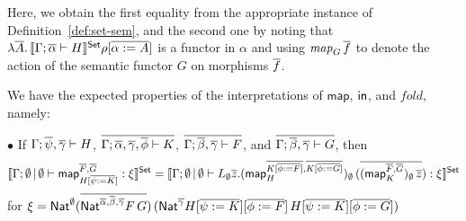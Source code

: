 \documentclass[runningheads]{llncs}
\renewcommand{\id}{\mathit{id}}
\newcommand{\map}{\mathsf{map}}
\newcommand{\fold}{\mathit{fold}}
\renewcommand{\id}{\mathit{id}}
\begin{document}
\begin{comment}
\[\begin{array}{rl}
&\setsem{
\Gamma;\emptyset \,|\, \emptyset
\vdash \map^{\ol{\sigma},\ol{\tau}}_H
: \Nat^\emptyset\;(\ol{\Nat^{\emptyset}\,\sigma\,\tau})\; {}
(\Nat^{\emptyset}\,H[\ol{\alpha := \sigma}]\,H[\ol{\alpha := \tau}])
} \rho\, \ast \\
=& \lambda \ol{f : \setsem{\Gamma; \emptyset \vdash \sigma}\rho \to \setsem{\Gamma; \emptyset \vdash \tau}\rho}.\,
\setsem{\Gamma; \ol{\alpha}\vdash H}
\id_{\rho}[\ol{\alpha := f}] \\
=& \lambda \ol{f : \setsem{\Gamma; \emptyset \vdash \sigma}\rho \to \setsem{\Gamma; \emptyset \vdash \tau}\rho}.\,
\mathit{map}_{\lambda \ol{A}.\,\setsem{\Gamma; \ol{\alpha}\vdash H} \rho [\ol{\alpha := A}]} \ol{f} \\
=& \mathit{map}_{\lambda \ol{A}.\,\setsem{\Gamma; \ol{\alpha}\vdash H} \rho [\ol{\alpha := A}]}
\end{array}
\]
\end{comment}

\vspace*{0.05in}

\noindent
Here, we obtain the first equality from the appropriate instance of
Definition~\ref{def:set-sem}, and the second one by noting that
$\lambda \overline{A}.\,\llbracket{\Gamma; \overline{\alpha}\vdash H}\rrbracket^{\mathsf{Set}} \rho
[\overline{\alpha := A}]$ is a functor in $\alpha$ and using
$\mathit{map}_G\,\overline{f}$ to denote the action of the semantic functor
$G$ on morphisms $\overline{f}$.

\vspace*{0.1in}

We have the expected properties of the interpretations of $\map$,
$\mathsf{in}$, and $\fold$, namely:

\vspace*{0.1in}

\noindent
$\bullet$\;  If
$\Gamma; \overline{\psi}, \overline{\gamma} \vdash H$,\;
$\overline{\Gamma; \overline{\alpha}, \overline{\gamma}, \overline{\phi} \vdash K}$,\;
$\overline{\Gamma; \overline{\beta}, \overline{\gamma} \vdash F}$,\; and
$\overline{\Gamma; \overline{\beta}, \overline{\gamma} \vdash G}$,
then
\[\setsem{\Gamma; \emptyset \,|\, \emptyset \vdash
\map_{H[\ol{\psi := K}]}^{\ol{F}, \ol{G}} : \xi} = \setsem{\Gamma;
  \emptyset \,|\, \emptyset \vdash L_\emptyset \ol
  z. (\map_H^{\ol{K[\ol{\phi := F}]}, 
    \ol{K[\ol{\phi := G}]}})_\emptyset \,(\ol{(\map_K^{\ol{F}, \ol{G}})_\emptyset \, \ol z}) :
  \xi}\]
for $\xi = \mathsf{Nat}^{\emptyset} (\overline{\mathsf{Nat}^{\overline{\alpha}, \overline{\beta},
    \overline{\gamma}} F\, G})\, (\mathsf{Nat}^{\overline{\gamma}} H[\overline{\psi :=
    K}][\overline{\phi := F}]\, H[\overline{\psi := K}][\overline{\phi := G}])$
\end{document}
